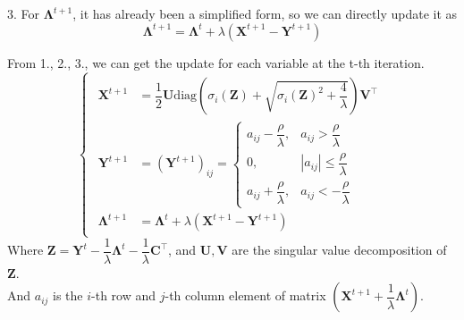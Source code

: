 3. For $\mathbf{\Lambda}^{t+1}$, it has already been a simplified form, so we can directly update it as
$$\mathbf{\Lambda}^{t+1}=\mathbf{\Lambda}^t+\lambda(\mathbf{X}^{t+1}-\mathbf{Y}^{t+1})$$

From 1., 2., 3., we can get the update for each variable at the t-th iteration.\\
$$\begin{cases}
\begin{aligned}
\mathbf{X}^{t+1} &= \dfrac{1}{2}\mathbf{U}\text{diag}\left(\sigma_i(\mathbf{Z}) + \sqrt{\sigma_i(\mathbf{Z})^2 + \dfrac{4}{\lambda}}\right)\mathbf{V}^{\top} \\
\mathbf{Y}^{t+1} &= \left(\mathbf{Y}^{t+1}\right)_{ij} = \begin{cases}
a_{ij}-\dfrac{\rho}{\lambda}, & a_{ij} > \dfrac{\rho}{\lambda} \\
0, & |a_{ij}| \leq \dfrac{\rho}{\lambda} \\
a_{ij}+\dfrac{\rho}{\lambda}, & a_{ij} < -\dfrac{\rho}{\lambda}
\end{cases} \\
\mathbf{\Lambda}^{t+1} &= \mathbf{\Lambda}^t+\lambda(\mathbf{X}^{t+1}-\mathbf{Y}^{t+1})
\end{aligned}
\end{cases}$$
Where $\mathbf{Z}= \mathbf{Y}^t-\dfrac{1}{\lambda}\mathbf{\Lambda}^t-\dfrac{1}{\lambda}\mathbf{C^{\top}}$, and $\mathbf{U},\mathbf{V}$ are the singular value decomposition of $\mathbf{Z}$.\\
And $a_{ij}$ is the $i$-th row and $j$-th column element of matrix $\left(\mathbf{X}^{t+1}+\dfrac{1}{\lambda}\mathbf{\Lambda}^t\right)$.

\newpage